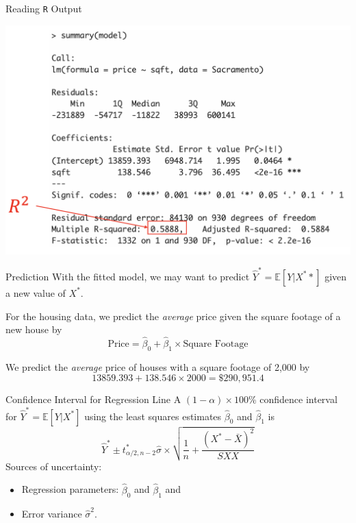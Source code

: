 \documentclass{beamer}
\begin{document}
\begin{frame}{Reading \texttt{R} Output}
    \begin{center}
        \includegraphics[width=\linewidth]{figures/r-squared.png}
    \end{center}
\end{frame}

\begin{frame}{Prediction}
    With the fitted model, we may want to predict $\hat{Y}^* = \mathbb{E}[Y | X^**]$ given a new value of $X^*$. 

    \vspace*{1em}

    For the housing data, we predict the \textit{average} price given the square footage of a new house by
    \begin{equation*}
        \textrm{Price} = \hat{\beta}_0 + \hat{\beta}_1 \times \textrm{Square Footage}
    \end{equation*}

    We predict the \textit{average} price of houses with a square footage of 2,000 by 
    \begin{equation*}
        13859.393 + 138.546 \times 2000 = \$290,951.4
    \end{equation*}
\end{frame}

\begin{frame}{Confidence Interval for Regression Line}
    A $(1-\alpha)\times 100$\% confidence interval for $\hat{Y}^* = \mathbb{E}[Y | X^*]$ using the least squares estimates $\hat{\beta}_0$ and $\hat{\beta}_1$ is 
    \begin{equation*}
        \hat{Y}^* \pm t^*_{\alpha/2, n-2} \hat{\sigma}\times \sqrt{\frac{1}{n} + \frac{(X^* - \bar{X})^2}{SXX}}
    \end{equation*}
    Sources of uncertainty:
    \begin{itemize}
        \item Regression parameters: $\hat{\beta}_0$ and $\hat{\beta}_1$ and 
        \item Error variance $\hat{\sigma}^2$. 
    \end{itemize}
\end{frame}
\end{document}
